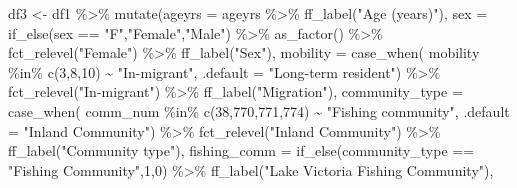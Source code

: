 \documentclass[
  letterpaper,
  DIV=11,
  numbers=noendperiod]{scrartcl}
\newenvironment{Shaded}{\begin{snugshade}}{\end{snugshade}}
\newcommand{\AttributeTok}[1]{\textcolor[rgb]{0.40,0.45,0.13}{#1}}
\newcommand{\DecValTok}[1]{\textcolor[rgb]{0.68,0.00,0.00}{#1}}
\newcommand{\FunctionTok}[1]{\textcolor[rgb]{0.28,0.35,0.67}{#1}}
\newcommand{\NormalTok}[1]{\textcolor[rgb]{0.00,0.23,0.31}{#1}}
\newcommand{\OtherTok}[1]{\textcolor[rgb]{0.00,0.23,0.31}{#1}}
\newcommand{\SpecialCharTok}[1]{\textcolor[rgb]{0.37,0.37,0.37}{#1}}
\newcommand{\StringTok}[1]{\textcolor[rgb]{0.13,0.47,0.30}{#1}}
\begin{document}
\begin{Shaded}
\begin{Highlighting}[]
\NormalTok{df3 }\OtherTok{\textless{}{-}}\NormalTok{ df1 }\SpecialCharTok{\%\textgreater{}\%} 
  \FunctionTok{mutate}\NormalTok{(}\AttributeTok{ageyrs =}\NormalTok{ ageyrs }\SpecialCharTok{\%\textgreater{}\%}  \FunctionTok{ff\_label}\NormalTok{(}\StringTok{"Age (years)"}\NormalTok{),}
         \AttributeTok{sex =} \FunctionTok{if\_else}\NormalTok{(sex }\SpecialCharTok{==} \StringTok{"F"}\NormalTok{,}\StringTok{"Female"}\NormalTok{,}\StringTok{"Male"}\NormalTok{) }\SpecialCharTok{\%\textgreater{}\%} 
           \FunctionTok{as\_factor}\NormalTok{() }\SpecialCharTok{\%\textgreater{}\%}
           \FunctionTok{fct\_relevel}\NormalTok{(}\StringTok{"Female"}\NormalTok{) }\SpecialCharTok{\%\textgreater{}\%} 
           \FunctionTok{ff\_label}\NormalTok{(}\StringTok{"Sex"}\NormalTok{),}
         \AttributeTok{mobility =} \FunctionTok{case\_when}\NormalTok{(}
\NormalTok{           mobility }\SpecialCharTok{\%in\%} \FunctionTok{c}\NormalTok{(}\DecValTok{3}\NormalTok{,}\DecValTok{8}\NormalTok{,}\DecValTok{10}\NormalTok{) }\SpecialCharTok{\textasciitilde{}} \StringTok{"In{-}migrant"}\NormalTok{,}
           \AttributeTok{.default =} \StringTok{"Long{-}term resident"}\NormalTok{) }\SpecialCharTok{\%\textgreater{}\%} 
           \FunctionTok{fct\_relevel}\NormalTok{(}\StringTok{"In{-}migrant"}\NormalTok{) }\SpecialCharTok{\%\textgreater{}\%} 
           \FunctionTok{ff\_label}\NormalTok{(}\StringTok{"Migration"}\NormalTok{),}
         \AttributeTok{community\_type =} \FunctionTok{case\_when}\NormalTok{(}
\NormalTok{           comm\_num }\SpecialCharTok{\%in\%} \FunctionTok{c}\NormalTok{(}\DecValTok{38}\NormalTok{,}\DecValTok{770}\NormalTok{,}\DecValTok{771}\NormalTok{,}\DecValTok{774}\NormalTok{) }\SpecialCharTok{\textasciitilde{}} \StringTok{"Fishing community"}\NormalTok{,}
                                     \AttributeTok{.default =} \StringTok{"Inland Community"}\NormalTok{) }\SpecialCharTok{\%\textgreater{}\%} 
           \FunctionTok{fct\_relevel}\NormalTok{(}\StringTok{"Inland Community"}\NormalTok{) }\SpecialCharTok{\%\textgreater{}\%} 
           \FunctionTok{ff\_label}\NormalTok{(}\StringTok{"Community type"}\NormalTok{),}
         \AttributeTok{fishing\_comm =} \FunctionTok{if\_else}\NormalTok{(community\_type }\SpecialCharTok{==} \StringTok{"Fishing Community"}\NormalTok{,}\DecValTok{1}\NormalTok{,}\DecValTok{0}\NormalTok{) }\SpecialCharTok{\%\textgreater{}\%} 
           \FunctionTok{ff\_label}\NormalTok{(}\StringTok{"Lake Victoria Fishing Community"}\NormalTok{),}
         

\end{Highlighting}
\end{Shaded}
\end{document}
